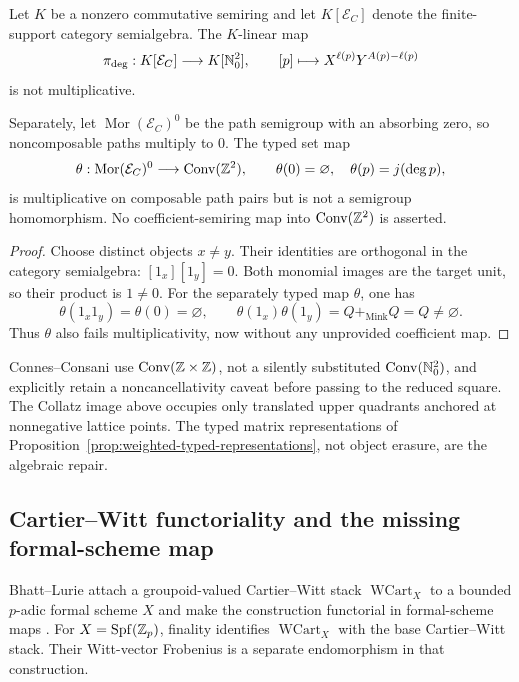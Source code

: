 \begin{proposition}
\label{prop:symbolic-tropical-algebra-obstruction}
Let $K$ be a nonzero commutative semiring and let $K[\mathcal E_C]$ denote
the finite-support category semialgebra.  The $K$-linear map
\[
 \pi_{\deg}:K[\mathcal E_C]\longrightarrow K[\mathbb{N}_{0}^2],
 \qquad [p]\longmapsto X^{\ell(p)}Y^{A(p)-\ell(p)}
\]
is not multiplicative.

Separately, let $\operatorname{Mor}(\mathcal E_C)^0$ be the path semigroup
with an absorbing zero, so noncomposable paths multiply to $0$.  The typed
set map
\[
 \theta:\operatorname{Mor}(\mathcal E_C)^0
 \longrightarrow\operatorname{Conv}(\mathbb{Z}^2),
 \qquad
 \theta(0)=\varnothing,
 \quad \theta(p)=j(\deg p),
\]
is multiplicative on composable path pairs but is not a semigroup
homomorphism.  No coefficient-semiring map into
$\operatorname{Conv}(\mathbb{Z}^2)$ is asserted.
\end{proposition}

\begin{proof}
Choose distinct objects $x\ne y$.  Their identities are orthogonal in the
category semialgebra: $[1_x][1_y]=0$.  Both monomial images are the target
unit, so their product is $1\ne0$.  For the separately typed map $\theta$,
one has
\[
 \theta(1_x1_y)=\theta(0)=\varnothing,
 \qquad
 \theta(1_x)\theta(1_y)=Q+_{\mathrm{Mink}}Q=Q\ne\varnothing.
\]
Thus $\theta$ also fails multiplicativity, now without any unprovided
coefficient map.
\end{proof}

Connes--Consani use $\operatorname{Conv}(\mathbb{Z}\times\mathbb{Z})$, not a silently
substituted $\operatorname{Conv}(\mathbb{N}_{0}^2)$, and explicitly retain a
noncancellativity caveat before passing to the reduced square.  The Collatz
image above occupies only translated upper quadrants anchored at
nonnegative lattice points.
The typed matrix representations of
Proposition~\ref{prop:weighted-typed-representations}, not object erasure,
are the algebraic repair.

\subsection{Cartier--Witt functoriality and the missing formal-scheme map}

Bhatt--Lurie attach a groupoid-valued Cartier--Witt stack $\operatorname{WCart}_X$
to a bounded $p$-adic formal scheme $X$ and make the construction functorial
in formal-scheme maps \cite{BhattLurieWCart}.  For
$X=\operatorname{Spf}(\mathbb{Z}_p)$, finality identifies $\operatorname{WCart}_X$
with the base Cartier--Witt stack.  Their Witt-vector Frobenius is a separate
endomorphism in that construction.

